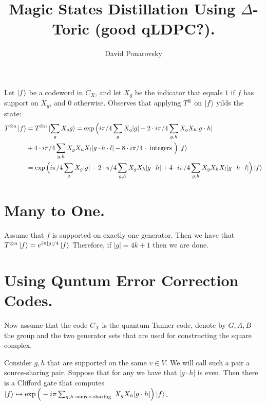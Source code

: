 \documentclass[manuscript,screen,review]{acmart}
\begin{document}

\title{Magic States Distillation  Using $\Delta$-Toric (good qLDPC?). } 
\author{David Ponarovsky}
\maketitle

%

Let $\ket{f}$ be a codeword in $C_{X}$, and let $X_{g}$ be the indicator that equals $1$ if $f$ has support on $X_{g}$, and $0$ otherwise. Observes that applying $T^{\otimes}$ on $\ket{f}$ yilds the state: 
\begin{equation*}
  \begin{split}
    T^{\otimes n}\ket{f} & =  T^{\otimes n}\ket{\sum_{g} X_{g}g } = \exp \Big( i\pi/4 \sum_{g} X_{g}|g|  -  2 \cdot i \pi/4 \sum_{g,h} X_{g}X_{h}|g\cdot h| \\
    & +  4 \cdot i\pi/4 \sum_{g,h} X_{g}X_{h}X_{l}|g\cdot h \cdot l| -   8  \cdot i\pi/4 \cdot \text{ integers } \Big) \ket{f} \\
    & = \exp \Big( i\pi/4 \sum_{g} X_{g}|g|  -  2 \cdot \pi/4 \sum_{g,h} X_{g}X_{h}|g\cdot h| +  4 \cdot i\pi/4 \sum_{g,h} X_{g}X_{h}X_{l}|g\cdot h \cdot l| \Big) \ket{f}
  \end{split}
\end{equation*}

\section{Many to One.}
Assume that $f$ is supported on exactly one generator. Then we have that $T^{\otimes n}\ket{f}  = e^{i\pi|g|/4}\ket{f}$ Therefore, if $|g| = 4k+1$ then we are done.


\section{Using Quntum Error Correction Codes.}

Now assume that the code $C_{X}$ is the quantum Tanner code, denote by $G,A,B$ the group and the two generator sets that are used for constructing the square complex. 

\begin{claim} 
Consider $g,h$ that are supported on the same $v\in V$. We will call such a pair a source-sharing pair. Suppose that for any we have that $|g \cdot h|$ is even. Then there is a Clifford gate that computes $\ket{f} \mapsto \exp \Big(  -  i\pi \sum_{g,h \text{ source-sharing }} X_{g}X_{h}|g\cdot h|  \Big) \ket{f} $.
\end{claim}
\end{document}
